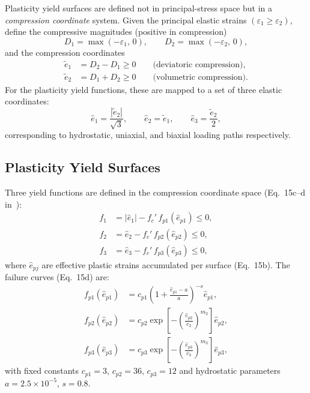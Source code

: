 Plasticity yield surfaces are defined not in principal-stress space but in a
\emph{compression coordinate} system.  Given the principal elastic strains
$(\varepsilon_1 \ge \varepsilon_2)$, define the compressive magnitudes (positive in
compression)
\[
  D_1 = \max(-\varepsilon_1,\, 0), \qquad D_2 = \max(-\varepsilon_2,\, 0),
\]
and the compression coordinates
\begin{align}
  \tilde e_1 &= D_2 - D_1 \ge 0 \qquad \text{(deviatoric compression)},
  \label{eq:kb-e1}
  \\[4pt]
  \tilde e_2 &= D_1 + D_2 \ge 0 \qquad \text{(volumetric compression)}.
  \label{eq:kb-e2}
\end{align}
For the plasticity yield functions, these are mapped to a set of three
elastic coordinates:
\[
  \hat{e}_1 = \frac{|\tilde e_2|}{\sqrt{3}}, \qquad
  \hat{e}_2 = \tilde e_1, \qquad
  \hat{e}_3 = \frac{\tilde e_2}{2},
\]
corresponding to hydrostatic, uniaxial, and biaxial loading paths
respectively.

\subsection{Plasticity Yield Surfaces}
\label{ssec:kb-plasticity}

Three yield functions are defined in the compression coordinate space
(Eq.~15c--d in~\cite{KoBathe2026}):
\begin{align}
  f_1 &= |\hat{e}_1| - f_c'\,f_{p1}(\hat{e}_{p1}) \le 0, \label{eq:kb-f1} \\
  f_2 &= \hat{e}_2   - f_c'\,f_{p2}(\hat{e}_{p2}) \le 0, \label{eq:kb-f2} \\
  f_3 &= \hat{e}_3   - f_c'\,f_{p3}(\hat{e}_{p3}) \le 0, \label{eq:kb-f3}
\end{align}
where $\hat{e}_{pj}$ are effective plastic strains accumulated per surface
(Eq.~15b).  The failure curves (Eq.~15d) are:
\begin{align}
  f_{p1}(\hat{e}_{p1}) &= c_{p1}\left(1 + \frac{\hat{e}_{p1}-a}{a}\right)^{-s}\hat{e}_{p1},
  \label{eq:kb-fp1} \\
  f_{p2}(\hat{e}_{p2}) &= c_{p2}\exp\!\left[-\left(\frac{\hat{e}_{p2}}{c_2}\right)^{m_2}\right]\hat{e}_{p2},
  \label{eq:kb-fp2} \\
  f_{p3}(\hat{e}_{p3}) &= c_{p3}\exp\!\left[-\left(\frac{\hat{e}_{p3}}{c_3}\right)^{m_3}\right]\hat{e}_{p3},
  \label{eq:kb-fp3}
\end{align}
with fixed constants $c_{p1}=3$, $c_{p2}=36$, $c_{p3}=12$ and hydrostatic
parameters $a = 2.5\times 10^{-5}$, $s = 0.8$.

